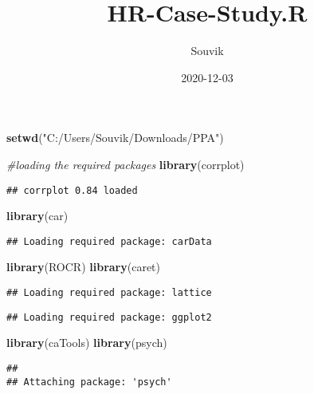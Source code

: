 \documentclass[
]{article}
\title{HR-Case-Study.R}
\author{Souvik}
\date{2020-12-03}
\newenvironment{Shaded}{\begin{snugshade}}{\end{snugshade}}
\newcommand{\CommentTok}[1]{\textcolor[rgb]{0.56,0.35,0.01}{\textit{#1}}}
\newcommand{\KeywordTok}[1]{\textcolor[rgb]{0.13,0.29,0.53}{\textbf{#1}}}
\newcommand{\NormalTok}[1]{#1}
\newcommand{\StringTok}[1]{\textcolor[rgb]{0.31,0.60,0.02}{#1}}
\begin{document}
\maketitle

\begin{Shaded}
\begin{Highlighting}[]
\KeywordTok{setwd}\NormalTok{(}\StringTok{"C:/Users/Souvik/Downloads/PPA"}\NormalTok{)}

\CommentTok{#loading the required packages }
\KeywordTok{library}\NormalTok{(corrplot)}
\end{Highlighting}
\end{Shaded}

\begin{verbatim}
## corrplot 0.84 loaded
\end{verbatim}

\begin{Shaded}
\begin{Highlighting}[]
\KeywordTok{library}\NormalTok{(car)}
\end{Highlighting}
\end{Shaded}

\begin{verbatim}
## Loading required package: carData
\end{verbatim}

\begin{Shaded}
\begin{Highlighting}[]
\KeywordTok{library}\NormalTok{(ROCR)}
\KeywordTok{library}\NormalTok{(caret)}
\end{Highlighting}
\end{Shaded}

\begin{verbatim}
## Loading required package: lattice
\end{verbatim}

\begin{verbatim}
## Loading required package: ggplot2
\end{verbatim}

\begin{Shaded}
\begin{Highlighting}[]
\KeywordTok{library}\NormalTok{(caTools)}
\KeywordTok{library}\NormalTok{(psych)}
\end{Highlighting}
\end{Shaded}

\begin{verbatim}
## 
## Attaching package: 'psych'
\end{verbatim}
\end{document}
